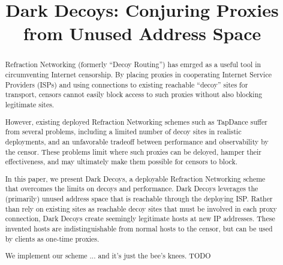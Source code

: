 \documentclass[letterpaper,twocolumn,10pt]{article}
\begin{document}
\date{}

\title{\Large \bf Dark Decoys:
  Conjuring Proxies from Unused Address Space}


\maketitle

\begin{abstract}
Refraction Networking (formerly ``Decoy Routing'') has emrged as a useful tool in circumventing
        Internet censorship. By placing proxies in cooperating Internet Service
        Providers (ISPs) and using connections to existing reachable
        ``decoy'' sites for transport, censors cannot easily block access to
        such proxies without also blocking legitimate sites.

However, existing deployed Refraction Networking schemes such as TapDance suffer
from several problems, including a limited number of decoy sites in realistic
deployments, and an unfavorable tradeoff between performance and observability
by the censor. These problems limit where such proxies can be deloyed, hamper
their effectiveness, and may ultimately make them possible for censors to block.

In this paper, we present Dark Decoys, a deployable Refraction Networking scheme that
overcomes the limits on decoys and performance. Dark Decoys leverages the (primarily) unused address
space that is reachable through the deploying ISP. Rather than rely on existing
sites as reachable decoy sites that must be involved in each proxy connection,
Dark Decoys create seemingly legitimate hosts at new IP addresses. These
invented hosts are indistinguishable from normal hosts to the censor, but can
be used by clients as one-time proxies.

We implement our scheme ... and it's just the bee's knees. TODO

\end{abstract}
\end{document}
